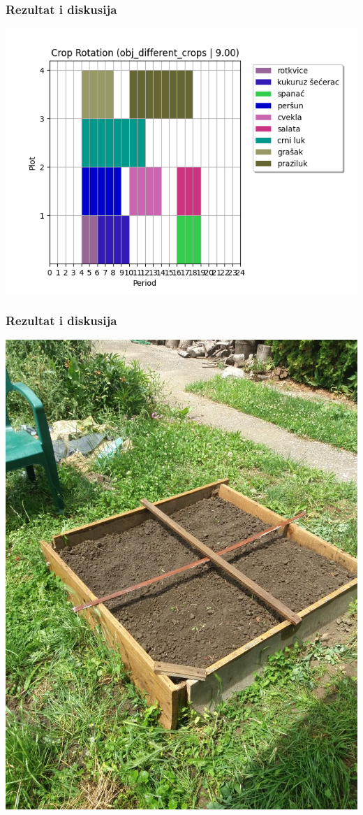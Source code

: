 \documentclass{beamer}
\begin{document}
\begin{frame}
  \frametitle{Rezultat i diskusija}
  \includegraphics[height=0.85\textheight]{slike/diverse.png}
\end{frame}
\begin{frame}
  \frametitle{Rezultat i diskusija}
  \includegraphics[height=0.85\textheight]{slike/basta3}\centering
\end{frame}
\end{document}
